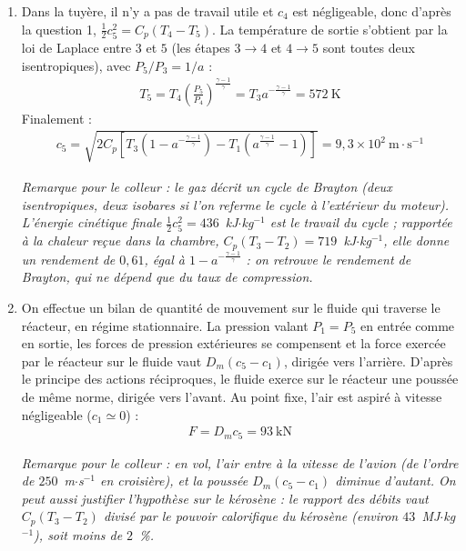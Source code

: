 \begin{correction}
\begin{enumerate}
	\item Dans la tuyère, il n'y a pas de travail utile et $c_4$ est négligeable, donc d'après la question 1, $\frac{1}{2}c_5^2=C_p(T_4-T_5)$. La température de sortie s'obtient par la loi de Laplace entre $3$ et $5$ (les étapes $3\rightarrow4$ et $4\rightarrow5$ sont toutes deux isentropiques), avec $P_5/P_3=1/a$ :
	\begin{align*}
		T_5=T_4\left(\frac{P_5}{P_4}\right)^{\frac{\gamma-1}{\gamma}}=T_3a^{-\frac{\gamma-1}{\gamma}}=572~\text{K}
	\end{align*}
	Finalement :
	\begin{align*}
		\boxed{c_5=\sqrt{2C_p\left[T_3\left(1-a^{-\frac{\gamma-1}{\gamma}}\right)-T_1\left(a^{\frac{\gamma-1}{\gamma}}-1\right)\right]}=9{,}3\times10^{2}~\text{m}\cdot\text{s}^{-1}}
	\end{align*}

	\textit{Remarque pour le colleur : le gaz décrit un cycle de Brayton (deux isentropiques, deux isobares si l'on referme le cycle à l'extérieur du moteur). L'énergie cinétique finale $\frac{1}{2}c_5^2=436$~kJ$\cdot$kg$^{-1}$ est le travail du cycle ; rapportée à la chaleur reçue dans la chambre, $C_p(T_3-T_2)=719$~kJ$\cdot$kg$^{-1}$, elle donne un rendement de $0{,}61$, égal à $1-a^{-\frac{\gamma-1}{\gamma}}$ : on retrouve le rendement de Brayton, qui ne dépend que du taux de compression.}

	\item On effectue un bilan de quantité de mouvement sur le fluide qui traverse le réacteur, en régime stationnaire. La pression valant $P_1=P_5$ en entrée comme en sortie, les forces de pression extérieures se compensent et la force exercée par le réacteur sur le fluide vaut $D_m(c_5-c_1)$, dirigée vers l'arrière. D'après le principe des actions réciproques, le fluide exerce sur le réacteur une poussée de même norme, dirigée vers l'avant. Au point fixe, l'air est aspiré à vitesse négligeable ($c_1\simeq0$) :
	\begin{align*}
		\boxed{F=D_mc_5=93~\text{kN}}
	\end{align*}

	\textit{Remarque pour le colleur : en vol, l'air entre à la vitesse de l'avion (de l'ordre de $250$~m$\cdot$s$^{-1}$ en croisière), et la poussée $D_m(c_5-c_1)$ diminue d'autant. On peut aussi justifier l'hypothèse sur le kérosène : le rapport des débits vaut $C_p(T_3-T_2)$ divisé par le pouvoir calorifique du kérosène (environ $43$~MJ$\cdot$kg$^{-1}$), soit moins de $2$~\%.}

\end{enumerate}

\end{correction}

